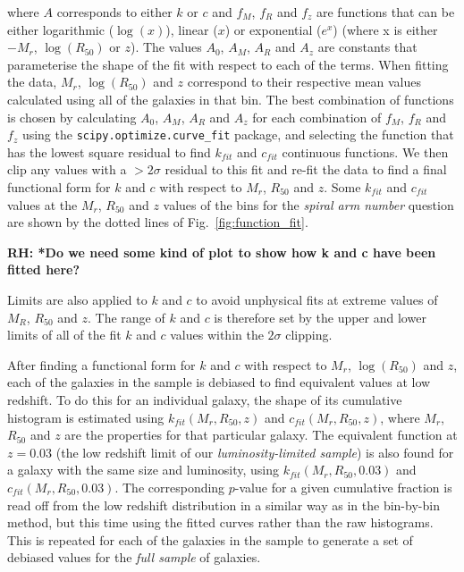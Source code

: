 \documentclass[useAMS,usenatbib]{mn2e}
\newcommand{\rh}[1]{{\bf \textcolor{RoyalPurple}{RH: #1}}}
\begin{document}
where $A$ corresponds to either $k$ or $c$ and $f_M$, $f_R$ and $f_z$ are functions that can be either logarithmic ($\log(x)$), linear ($x$) or exponential ($e^x$) (where x is either $-M_r$, $\log(R_{50})$ or $z$). The values $A_0$, $A_M$, $A_R$ and $A_z$ are constants that parameterise the shape of the fit with respect to each of the terms. When fitting the data, $M_r$, $\log(R_{50})$ and $z$ correspond to their respective mean values calculated using all of the galaxies in that bin. The best combination of functions is chosen by calculating $A_0$, $A_M$, $A_R$ and $A_z$ for each combination of $f_M$, $f_R$ and $f_z$ using the \texttt{scipy.optimize.curve\_fit} package, and selecting the function that has the lowest square residual to find $k_{fit}$ and $c_{fit}$ continuous functions. We then clip any values with a $>2\sigma$ residual to this fit and re-fit the data to find a final functional form for $k$ and $c$ with respect to $M_r$, $R_{50}$ and $z$. Some $k_{fit}$ and $c_{fit}$ values at the $M_r$, $R_{50}$ and $z$ values of the bins for the \textit{spiral arm number} question are shown by the dotted lines of Fig.~\ref{fig:function_fit}.

\rh{*Do we need some kind of plot to show how k and c have been fitted here?}

Limits are also applied to $k$ and $c$ to avoid unphysical fits at extreme values of $M_R$, $R_{50}$ and $z$. The range of $k$ and $c$ is therefore set by the upper and lower limits of all of the fit $k$ and $c$ values within the $2\sigma$ clipping.

After finding a functional form for $k$ and $c$ with respect to $M_r$, $\log(R_{50})$ and $z$, each of the galaxies in the sample is debiased to find equivalent values at low redshift. To do this for an individual galaxy, the shape of its cumulative histogram is estimated using $k_{fit}(M_r,R_{50},z)$ and $c_{fit}(M_r,R_{50},z)$, where $M_r$,$R_{50}$ and $z$ are the properties for that particular galaxy. The equivalent function at $z=0.03$ (the low redshift limit of our \textit{luminosity-limited sample}) is also found for a galaxy with the same size and luminosity, using $k_{fit}(M_r,R_{50},0.03)$ and $c_{fit}(M_r,R_{50},0.03)$. The corresponding $p$-value for a given cumulative fraction is read off from the low redshift distribution in a similar way as in the bin-by-bin method, but this time using the fitted curves rather than the raw histograms. This is repeated for each of the galaxies in the sample to generate a set of debiased values for the \textit{full sample} of galaxies.
\end{document}
